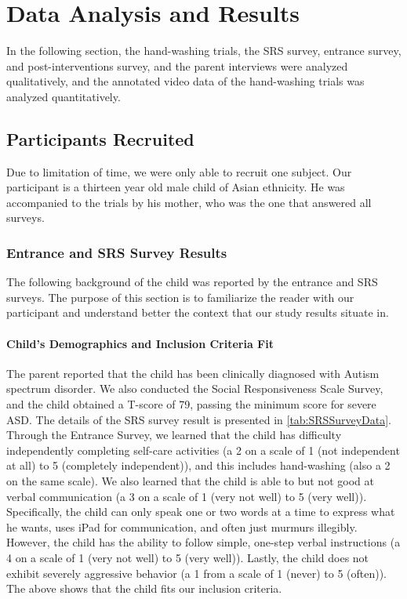 \section{Data Analysis and Results}
\label{Sec:DataAnalysisAndResults}
In the following section, the hand-washing trials, the SRS survey, entrance survey, and post-interventions survey, and the parent interviews were analyzed qualitatively, and the annotated video data of the hand-washing trials was analyzed quantitatively.

\subsection{Participants Recruited}
Due to limitation of time, we were only able to recruit one subject.  Our participant is a thirteen year old male child of Asian ethnicity.  He was accompanied to the trials by his mother, who was the one that answered all surveys.

\subsubsection{Entrance and SRS Survey Results}
The following background of the child was reported by the entrance and SRS surveys.  The purpose of this section is to familiarize the reader with our participant and understand better the context that our study results situate in.

\paragraph{Child's Demographics and Inclusion Criteria Fit}
The parent reported that the child has been clinically diagnosed with Autism spectrum disorder.  We also conducted the Social Responsiveness Scale Survey, and the child obtained a T-score of 79, passing the minimum score for severe ASD.  The details of the SRS survey result is presented in \ref{tab:SRSSurveyData}.  Through the Entrance Survey, we learned that the child has difficulty independently completing self-care activities (a 2 on a scale of 1 (not independent at all) to 5 (completely independent)), and this includes hand-washing (also a 2 on the same scale).  We also learned that the child is able to but not good at verbal communication (a 3 on a scale of 1 (very not well) to 5 (very well)).  Specifically, the child can only speak one or two words at a time to express what he wants, uses iPad for communication, and often just murmurs illegibly.  However, the child has the ability to follow simple, one-step verbal instructions (a 4 on a scale of 1 (very not well) to 5 (very well)).  Lastly, the child does not exhibit severely aggressive behavior (a 1 from a scale of 1 (never) to 5 (often)).  The above shows that the child fits our inclusion criteria.

